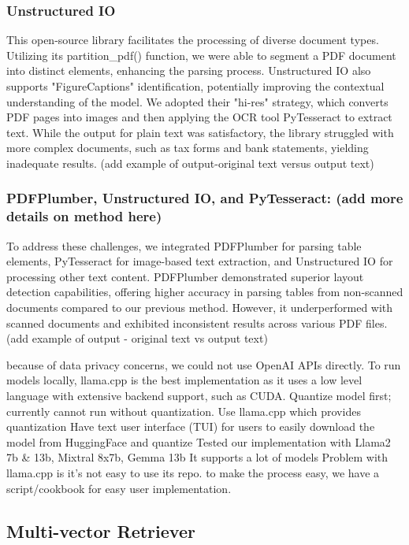 \documentclass{scrartcl}
\begin{document}
\subsubsection{Unstructured IO} 
This open-source library facilitates the processing of diverse document types. Utilizing its partition_pdf() function, we were able to segment a PDF document into distinct elements, enhancing the parsing process. Unstructured IO also supports "FigureCaptions" identification, potentially improving the contextual understanding of the model. We adopted their "hi-res" strategy, which converts PDF pages into images and then applying the OCR tool PyTesseract to extract text. 
While the output for plain text was satisfactory, the library struggled with more complex documents, such as tax forms and bank statements, yielding inadequate results.
(add example of output-original text versus output text)

\subsubsection{PDFPlumber, Unstructured IO, and PyTesseract: (add more details on method here)}
To address these challenges, we integrated PDFPlumber for parsing table elements, PyTesseract for image-based text extraction, and Unstructured IO for processing other text content. PDFPlumber demonstrated superior layout detection capabilities, offering higher accuracy in parsing tables from non-scanned documents compared to our previous method. However, it underperformed with scanned documents and exhibited inconsistent results across various PDF files.
(add example of output - original text vs output text)

because of data privacy concerns, we could not use OpenAI APIs directly. To run models locally, llama.cpp is the best implementation as it uses a low level language with extensive backend support, such as CUDA.
Quantize model first; currently cannot run without quantization.
Use llama.cpp which provides quantization 
Have text user interface (TUI) for users to easily download the model from HuggingFace and quantize
Tested our implementation with Llama2 7b & 13b, Mixtral 8x7b, Gemma 13b
It supports a lot of models
Problem with llama.cpp is it's not easy to use its repo. to make the process easy, we have a script/cookbook for easy user implementation.

\subsection{Multi-vector Retriever}
\end{document}
